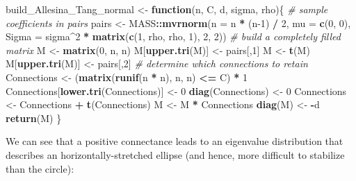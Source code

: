\documentclass[]{book}
\newenvironment{Shaded}{\begin{snugshade}}{\end{snugshade}}
\newcommand{\CommentTok}[1]{\textcolor[rgb]{0.56,0.35,0.01}{\textit{#1}}}
\newcommand{\ControlFlowTok}[1]{\textcolor[rgb]{0.13,0.29,0.53}{\textbf{#1}}}
\newcommand{\DataTypeTok}[1]{\textcolor[rgb]{0.13,0.29,0.53}{#1}}
\newcommand{\DecValTok}[1]{\textcolor[rgb]{0.00,0.00,0.81}{#1}}
\newcommand{\KeywordTok}[1]{\textcolor[rgb]{0.13,0.29,0.53}{\textbf{#1}}}
\newcommand{\NormalTok}[1]{#1}
\newcommand{\OperatorTok}[1]{\textcolor[rgb]{0.81,0.36,0.00}{\textbf{#1}}}
\newcommand{\StringTok}[1]{\textcolor[rgb]{0.31,0.60,0.02}{#1}}
\begin{document}
\begin{Shaded}
\begin{Highlighting}[]
\NormalTok{build_Allesina_Tang_normal <-}\StringTok{ }\ControlFlowTok{function}\NormalTok{(n, C, d, sigma, rho)\{}
  \CommentTok{# sample coefficients in pairs}
\NormalTok{  pairs <-}\StringTok{ }\NormalTok{MASS}\OperatorTok{::}\KeywordTok{mvrnorm}\NormalTok{(}\DataTypeTok{n =}\NormalTok{ n }\OperatorTok{*}\StringTok{ }\NormalTok{(n}\DecValTok{-1}\NormalTok{) }\OperatorTok{/}\StringTok{ }\DecValTok{2}\NormalTok{,}
                         \DataTypeTok{mu =} \KeywordTok{c}\NormalTok{(}\DecValTok{0}\NormalTok{, }\DecValTok{0}\NormalTok{),}
                         \DataTypeTok{Sigma =}\NormalTok{ sigma}\OperatorTok{^}\DecValTok{2} \OperatorTok{*}\StringTok{ }\KeywordTok{matrix}\NormalTok{(}\KeywordTok{c}\NormalTok{(}\DecValTok{1}\NormalTok{, rho, rho, }\DecValTok{1}\NormalTok{), }\DecValTok{2}\NormalTok{, }\DecValTok{2}\NormalTok{))}
  \CommentTok{# build a completely filled matrix}
\NormalTok{  M <-}\StringTok{ }\KeywordTok{matrix}\NormalTok{(}\DecValTok{0}\NormalTok{, n, n)}
\NormalTok{  M[}\KeywordTok{upper.tri}\NormalTok{(M)] <-}\StringTok{ }\NormalTok{pairs[,}\DecValTok{1}\NormalTok{]}
\NormalTok{  M <-}\StringTok{ }\KeywordTok{t}\NormalTok{(M)}
\NormalTok{  M[}\KeywordTok{upper.tri}\NormalTok{(M)] <-}\StringTok{ }\NormalTok{pairs[,}\DecValTok{2}\NormalTok{]}
  \CommentTok{# determine which connections to retain}
\NormalTok{  Connections <-}\StringTok{ }\NormalTok{(}\KeywordTok{matrix}\NormalTok{(}\KeywordTok{runif}\NormalTok{(n }\OperatorTok{*}\StringTok{ }\NormalTok{n), n, n) }\OperatorTok{<=}\StringTok{ }\NormalTok{C) }\OperatorTok{*}\StringTok{ }\DecValTok{1} 
\NormalTok{  Connections[}\KeywordTok{lower.tri}\NormalTok{(Connections)] <-}\StringTok{ }\DecValTok{0}
  \KeywordTok{diag}\NormalTok{(Connections) <-}\StringTok{ }\DecValTok{0}
\NormalTok{  Connections <-}\StringTok{ }\NormalTok{Connections }\OperatorTok{+}\StringTok{ }\KeywordTok{t}\NormalTok{(Connections)}
\NormalTok{  M <-}\StringTok{ }\NormalTok{M }\OperatorTok{*}\StringTok{ }\NormalTok{Connections}
  \KeywordTok{diag}\NormalTok{(M) <-}\StringTok{ }\OperatorTok{-}\NormalTok{d}
  \KeywordTok{return}\NormalTok{(M)}
\NormalTok{\}}
\end{Highlighting}
\end{Shaded}

We can see that a positive connectance leads to an eigenvalue distribution that describes an horizontally-stretched ellipse (and hence, more difficult to stabilize than the circle):
\end{document}
